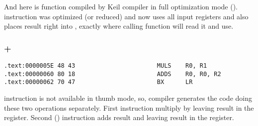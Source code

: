{And here is  function compiled by Keil compiler in full optimization mode} (\Othree).
{\MOV instruction was optimized (or reduced) and now  uses all 
input registers and also places result right into \Rzero,
exactly where calling function will read it and use.}

\subsubsection{\OptimizingKeil + \ThumbMode}

\begin{lstlisting}
.text:0000005E 48 43                       MULS    R0, R1
.text:00000060 80 18                       ADDS    R0, R0, R2
.text:00000062 70 47                       BX      LR
\end{lstlisting}

{ instruction is not available in thumb mode, so, compiler generates the code doing these two 
operations separately.}
{First  instruction multiply \Rzero by \Rone leaving result in the \Rone register.}
{Second () instruction adds result and \Rtwo leaving result in the \Rzero register.}

